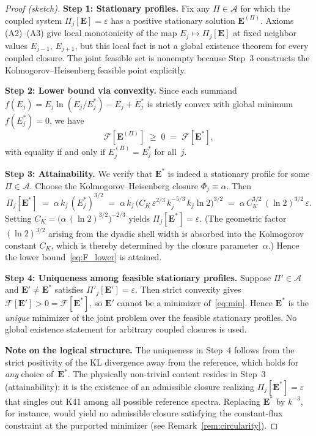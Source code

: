 \documentclass[12pt,a4paper]{article}
\theoremstyle{breakdef}
\theoremstyle{breakplain}
\theoremstyle{breakdef}
\begin{document}
\begin{proof}[Proof (sketch)]
\textbf{Step 1: Stationary profiles.}\quad
Fix any $\Pi \in \mathscr{A}$ for which the coupled system
$\Pi_j[\mathbf{E}] = \varepsilon$ has a positive stationary solution
$\mathbf{E}^{(\Pi)}$.  Axioms (A2)--(A3) give local monotonicity of the map
$E_j \mapsto \Pi_j[\mathbf{E}]$ at fixed neighbor values
$E_{j-1},\,E_{j+1}$, but this local fact is not a global existence theorem
for every coupled closure.  The joint feasible set is nonempty because
Step~3 constructs the Kolmogorov--Heisenberg feasible point explicitly.

\textbf{Step 2: Lower bound via convexity.}\quad
Since each summand $f(E_j) = E_j\ln(E_j/E_j^*) - E_j + E_j^*$ is
strictly convex with global minimum $f(E_j^*) = 0$, we have
\begin{equation}\label{eq:F_lower}
  \mathcal{F}[\mathbf{E}^{(\Pi)}]
  \;\ge\; 0
  \;=\; \mathcal{F}[\mathbf{E}^*],
\end{equation}
with equality if and only if $E_j^{(\Pi)} = E_j^*$ for all~$j$.

\textbf{Step 3: Attainability.}\quad
We verify that $\mathbf{E}^*$ is indeed a stationary profile for
some $\Pi \in \mathscr{A}$.  Choose the Kolmogorov--Heisenberg closure
$\Phi_j \equiv \alpha$.  Then
\[
  \Pi_j[\mathbf{E}^*]
  \;=\; \alpha\,k_j\,(E_j^*)^{3/2}
  \;=\; \alpha\,k_j\,
    \bigl(C_K\,\varepsilon^{2/3}\,k_j^{-5/3}\,k_j\ln 2\bigr)^{3/2}
  \;=\; \alpha\,C_K^{3/2}\,(\ln 2)^{3/2}\,\varepsilon.
\]
Setting $C_K = \bigl(\alpha\,(\ln 2)^{3/2}\bigr)^{-2/3}$ yields
$\Pi_j[\mathbf{E}^*] = \varepsilon$.  (The geometric factor $(\ln 2)^{3/2}$
arising from the dyadic shell width is absorbed into the Kolmogorov
constant $C_K$, which is thereby determined by the closure
parameter~$\alpha$.)  Hence the lower bound~\eqref{eq:F_lower} is
attained.

\textbf{Step 4: Uniqueness among feasible stationary profiles.}\quad
Suppose $\Pi' \in \mathscr{A}$ and $\mathbf{E}' \ne \mathbf{E}^*$ satisfies
$\Pi'_j[\mathbf{E}'] = \varepsilon$.  Then strict convexity gives
$\mathcal{F}[\mathbf{E}'] > 0 = \mathcal{F}[\mathbf{E}^*]$, so $\mathbf{E}'$
cannot be a minimizer of~\eqref{eq:min}.  Hence $\mathbf{E}^*$ is the
\emph{unique} minimizer of the joint problem over the feasible stationary
profiles.  No global existence statement for arbitrary coupled closures is
used.

\smallskip\noindent
\textbf{Note on the logical structure.}\quad
The uniqueness in Step~4 follows from the strict positivity of the KL
divergence away from the reference, which holds for \emph{any} choice
of~$\mathbf{E}^*$. The physically non-trivial content resides in
Step~3 (attainability): it is the existence of an admissible closure
realizing $\Pi_j[\mathbf{E}^*] = \varepsilon$ that singles out K41
among all possible reference spectra. Replacing $\mathbf{E}^*$ by
$k^{-3}$, for instance, would yield no admissible closure satisfying
the constant-flux constraint at the purported minimizer (see
Remark~\ref{rem:circularity}).


\end{proof}
\end{document}
